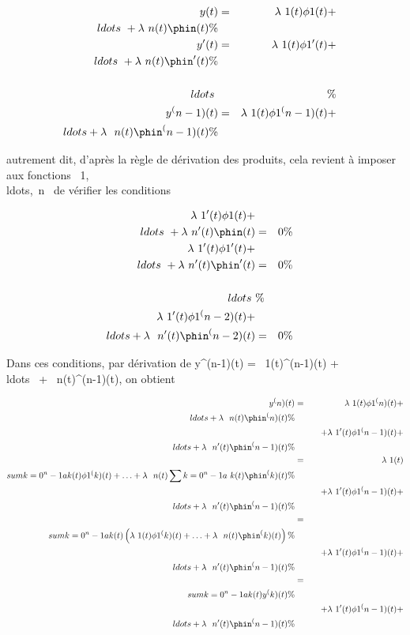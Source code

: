 \begin{align*} y(t)& =&
\lambda~1(t)\phi1(t) +
\\ldots~ +
\lambda~n(t)\phin(t) \%& \\
y'(t)& =& \lambda~1(t)\phi1'(t) +
\\ldots~ +
\lambda~n(t)\phin'(t) \%& \\
\\ldots~& & \%&
\\ y^(n-1)(t)& =& \lambda~
1(t)\phi1^(n-1)(t) +
\\ldots + \lambda~~
n(t)\phin^(n-1)(t)\%& \\
\end{align*}

autrement dit, d'après la règle de dérivation des produits, cela revient
à imposer aux fonctions
\lambda~1,\\ldots,\lambda~n~
de vérifier les conditions

\begin{align*} \lambda~1'(t)\phi1(t) +
\\ldots~ +
\lambda~n'(t)\phin(t)& =& 0\%&
\\ \lambda~1'(t)\phi1'(t) +
\\ldots~ +
\lambda~n'(t)\phin'(t)& =& 0\%&
\\ &
\\ldots~& \%&
\\
\lambda~1'(t)\phi1^(n-2)(t) +
\\ldots + \lambda~~
n'(t)\phin^(n-2)(t)& =& 0\%&
\\ \end{align*}

Dans ces conditions, par dérivation de y^(n-1)(t) =
\lambda~1(t)^(n-1)(t) +
\\ldots~ +
\lambda~n(t)\phin^(n-1)(t), on obtient

\begin{align*} y^(n)(t)& =& \lambda~
1(t)\phi1^(n)(t) +
\\ldots + \lambda~~
n(t)\phin^(n)(t) \%& \\
& & \quad +
\lambda~1'(t)\phi1^(n-1)(t) +
\\ldots + \lambda~~
n'(t)\phin^(n-1)(t) \%&
\\ & =&
\lambda~1(t)\\sum
k=0^n-1a k(t)\phi1^(k)(t) +
\ldots + \lambda~~
n(t)\sum k=0^n-1a~
k(t)\phin^(k)(t)\%& \\ &
& \quad + \lambda~1'(t)\phi1^(n-1)(t) +
\\ldots + \lambda~~
n'(t)\phin^(n-1)(t) \%&
\\ & =& \\sum
k=0^n-1a k(t)\left
(\lambda~1(t)\phi1^(k)(t) +
\ldots + \lambda~~
n(t)\phin^(k)(t)\right ) \%&
\\ & & \quad +
\lambda~1'(t)\phi1^(n-1)(t) +
\\ldots + \lambda~~
n'(t)\phin^(n-1)(t) \%&
\\ & =& \\sum
k=0^n-1a k(t)y^(k)(t) \%&
\\ & & \quad +
\lambda~1'(t)\phi1^(n-1)(t) +
\\ldots + \lambda~~
n'(t)\phin^(n-1)(t) \%&
\\ \end{align*}

